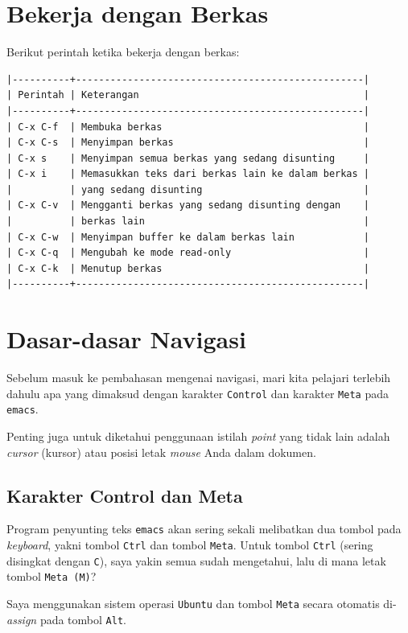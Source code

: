 \documentclass{article}
\begin{document}
\section{Bekerja dengan Berkas}
Berikut perintah ketika bekerja dengan berkas:

\begin{verbatim}
|----------+--------------------------------------------------|
| Perintah | Keterangan                                       |
|----------+--------------------------------------------------|
| C-x C-f  | Membuka berkas                                   |
| C-x C-s  | Menyimpan berkas                                 |
| C-x s    | Menyimpan semua berkas yang sedang disunting     |
| C-x i    | Memasukkan teks dari berkas lain ke dalam berkas |
|          | yang sedang disunting                            |
| C-x C-v  | Mengganti berkas yang sedang disunting dengan    |
|          | berkas lain                                      |
| C-x C-w  | Menyimpan buffer ke dalam berkas lain            |
| C-x C-q  | Mengubah ke mode read-only                       |
| C-x C-k  | Menutup berkas                                   |
|----------+--------------------------------------------------|
\end{verbatim}

\section{Dasar-dasar Navigasi}
Sebelum masuk ke pembahasan mengenai navigasi, mari kita
pelajari terlebih dahulu apa yang dimaksud dengan karakter
\verb=Control= dan karakter \verb=Meta= pada \verb=emacs=.

Penting juga untuk diketahui penggunaan istilah \emph{point} yang tidak 
lain adalah \emph{cursor} (kursor) atau posisi letak \emph{mouse} Anda dalam
dokumen.

\subsection{Karakter Control dan Meta}
Program penyunting teks \verb=emacs= akan sering sekali
melibatkan dua tombol pada \emph{keyboard}, yakni tombol
\verb=Ctrl= dan tombol \verb=Meta=. Untuk tombol \verb=Ctrl=
(sering disingkat dengan \verb=C=), saya yakin semua sudah
mengetahui, lalu di mana letak tombol \verb=Meta (M)=?

Saya menggunakan sistem operasi \verb=Ubuntu= dan tombol
\verb=Meta= secara otomatis di-\emph{assign} pada tombol
\verb=Alt=.
\end{document}
